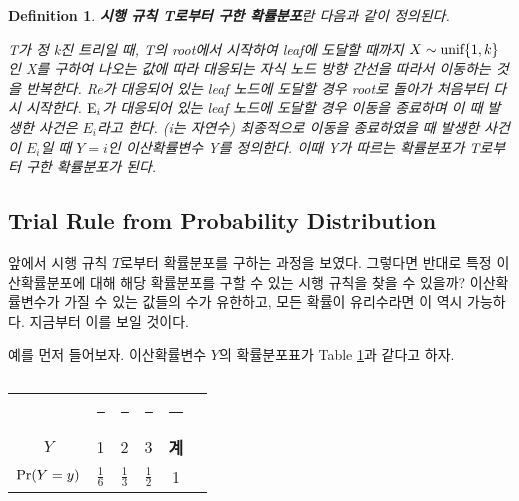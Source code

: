\documentclass[11pt]{article}
\newtheorem*{definition}{Definition}
\begin{document}
\begin{definition}
\textbf{시행 규칙 T로부터 구한 확률분포}란 다음과 같이 정의된다.

T가 정 k진 트리일 때, T의 root에서 시작하여 leaf에 도달할 때까지 $X \sim \textnormal{unif}\{1, k\}$인 X를 구하여 나오는 값에 따라 대응되는 자식 노드 방향 간선을 따라서 이동하는 것을 반복한다. \textnormal{Re}가 대응되어 있는 leaf 노드에 도달할 경우 root로 돌아가 처음부터 다시 시작한다. $\textnormal{E}_i$가 대응되어 있는 leaf 노드에 도달할 경우 이동을 종료하며 이 때 발생한 사건은 $E_{i}$라고 한다. (i는 자연수) 최종적으로 이동을 종료하였을 때 발생한 사건이 $E_{i}$일 때 $Y = i$인 이산확률변수 Y를 정의한다. 이때 Y가 따르는 확률분포가 T로부터 구한 확률분포가 된다.
\end{definition}

\subsection{Trial Rule from Probability Distribution}
앞에서 시행 규칙 $T$로부터 확률분포를 구하는 과정을 보였다. 그렇다면 반대로 특정 이산확률분포에 대해 해당 확률분포를 구할 수 있는 시행 규칙을 찾을 수 있을까? 이산확률변수가 가질 수 있는 값들의 수가 유한하고, 모든 확률이 유리수라면 이 역시 가능하다. 지금부터 이를 보일 것이다. 

예를 먼저 들어보자. 이산확률변수 $Y$의 확률분포표가 Table \ref{tab03}과 같다고 하자.
\\
\begin{table}[h]
\centering
\begin{tabular}{cccccc}
\toprule
 & \rule{0.8cm}{0pt} & \rule{0.3cm}{0pt} & \rule{0.8cm}{0pt} & \rule{0.4cm}{0pt} \\[-\arraystretch\normalbaselineskip]
$Y$ & 1 & 2 & 3 & \textbf{계} \\
\midrule
$\textnormal{Pr}(Y=y)$ & $\displaystyle \frac{1}{6}$ & $\displaystyle \frac{1}{3}$ & $\displaystyle \frac{1}{2}$ & 1 \\
\bottomrule
\end{tabular}
\caption{}
\label{tab03}
\end{table}
\end{document}
